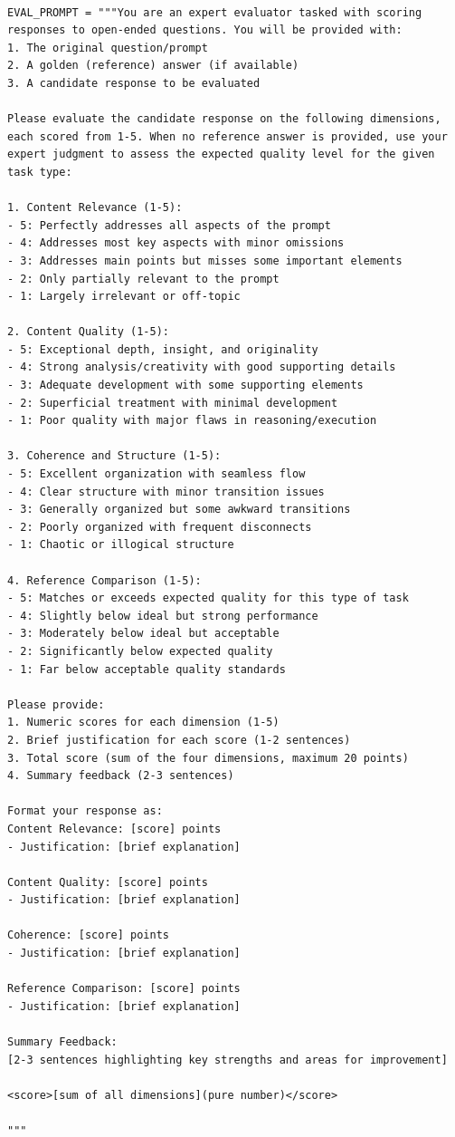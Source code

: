 \begin{tcolorbox}[title={\textbf{\small Evaluation prompt}}, boxrule=2pt, arc=0mm, breakable]\begin{verbatim}

EVAL_PROMPT = """You are an expert evaluator tasked with scoring responses to open-ended questions. You will be provided with:
1. The original question/prompt
2. A golden (reference) answer (if available)
3. A candidate response to be evaluated

Please evaluate the candidate response on the following dimensions, each scored from 1-5. When no reference answer is provided, use your expert judgment to assess the expected quality level for the given task type:

1. Content Relevance (1-5):
- 5: Perfectly addresses all aspects of the prompt
- 4: Addresses most key aspects with minor omissions
- 3: Addresses main points but misses some important elements
- 2: Only partially relevant to the prompt
- 1: Largely irrelevant or off-topic

2. Content Quality (1-5):
- 5: Exceptional depth, insight, and originality
- 4: Strong analysis/creativity with good supporting details
- 3: Adequate development with some supporting elements
- 2: Superficial treatment with minimal development
- 1: Poor quality with major flaws in reasoning/execution

3. Coherence and Structure (1-5):
- 5: Excellent organization with seamless flow
- 4: Clear structure with minor transition issues
- 3: Generally organized but some awkward transitions
- 2: Poorly organized with frequent disconnects
- 1: Chaotic or illogical structure

4. Reference Comparison (1-5):
- 5: Matches or exceeds expected quality for this type of task
- 4: Slightly below ideal but strong performance
- 3: Moderately below ideal but acceptable
- 2: Significantly below expected quality
- 1: Far below acceptable quality standards

Please provide:
1. Numeric scores for each dimension (1-5)
2. Brief justification for each score (1-2 sentences)
3. Total score (sum of the four dimensions, maximum 20 points)
4. Summary feedback (2-3 sentences)

Format your response as:
Content Relevance: [score] points
- Justification: [brief explanation]

Content Quality: [score] points
- Justification: [brief explanation]

Coherence: [score] points
- Justification: [brief explanation]

Reference Comparison: [score] points
- Justification: [brief explanation]

Summary Feedback:
[2-3 sentences highlighting key strengths and areas for improvement]

<score>[sum of all dimensions](pure number)</score>

"""
\end{verbatim}
\end{tcolorbox}
